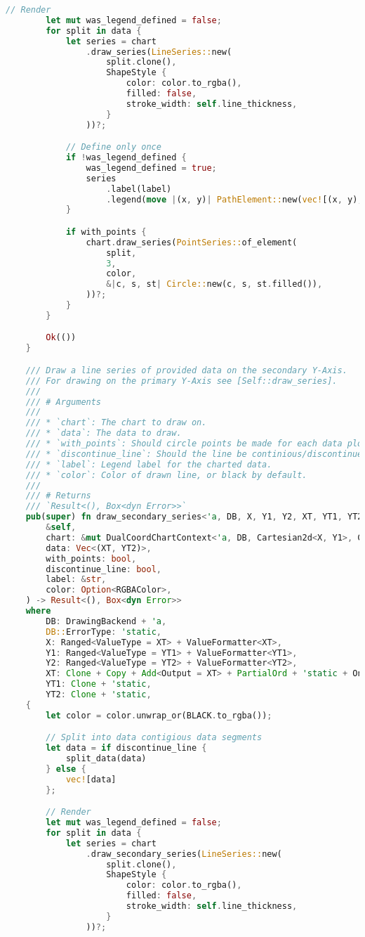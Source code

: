 \begin{lstlisting}[language=rust, caption={graphing/components.rs}]
		// Render
		let mut was_legend_defined = false;
		for split in data {
			let series = chart
				.draw_series(LineSeries::new(
					split.clone(),
					ShapeStyle {
						color: color.to_rgba(),
						filled: false,
						stroke_width: self.line_thickness,
					}
				))?;

			// Define only once
			if !was_legend_defined {
				was_legend_defined = true;
				series
					.label(label)
					.legend(move |(x, y)| PathElement::new(vec![(x, y), (x + 20, y)], color));
			}

			if with_points {
				chart.draw_series(PointSeries::of_element(
					split,
					3,
					color,
					&|c, s, st| Circle::new(c, s, st.filled()),
				))?;
			}
		}

		Ok(())
	}

	/// Draw a line series of provided data on the secondary Y-Axis.
	/// For drawing on the primary Y-Axis see [Self::draw_series].
	///
	/// # Arguments
	///
	/// * `chart`: The chart to draw on.
	/// * `data`: The data to draw.
	/// * `with_points`: Should circle points be made for each data plot?
	/// * `discontinue_line`: Should the line be continious/discontinue if part of the data is missing?
	/// * `label`: Legend label for the charted data.
	/// * `color`: Color of drawn line, or black by default.
	///
	/// # Returns
	/// `Result<(), Box<dyn Error>>`
	pub(super) fn draw_secondary_series<'a, DB, X, Y1, Y2, XT, YT1, YT2>(
		&self,
		chart: &mut DualCoordChartContext<'a, DB, Cartesian2d<X, Y1>, Cartesian2d<X, Y2>>,
		data: Vec<(XT, YT2)>,
		with_points: bool,
		discontinue_line: bool,
		label: &str,
		color: Option<RGBAColor>,
	) -> Result<(), Box<dyn Error>>
	where
		DB: DrawingBackend + 'a,
		DB::ErrorType: 'static,
		X: Ranged<ValueType = XT> + ValueFormatter<XT>,
		Y1: Ranged<ValueType = YT1> + ValueFormatter<YT1>,
		Y2: Ranged<ValueType = YT2> + ValueFormatter<YT2>,
		XT: Clone + Copy + Add<Output = XT> + PartialOrd + 'static + One,
		YT1: Clone + 'static,
		YT2: Clone + 'static,
	{
		let color = color.unwrap_or(BLACK.to_rgba());

		// Split into data contigious data segments
		let data = if discontinue_line {
			split_data(data)
		} else {
			vec![data]
		};

		// Render
		let mut was_legend_defined = false;
		for split in data {
			let series = chart
				.draw_secondary_series(LineSeries::new(
					split.clone(),
					ShapeStyle {
						color: color.to_rgba(),
						filled: false,
						stroke_width: self.line_thickness,
					}
				))?;


\end{lstlisting}
